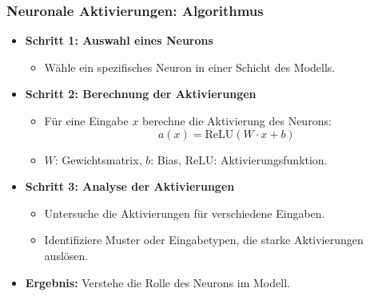 \documentclass[aspectratio=1610, xcolor=dvipsnames, 9pt]{beamer}
\begin{document}
\begin{frame}
  \frametitle{Neuronale Aktivierungen: Algorithmus}
  \begin{itemize}
    \item \textbf{Schritt 1: Auswahl eines Neurons}
    \begin{itemize}
      \item Wähle ein spezifisches Neuron in einer Schicht des Modells.
    \end{itemize}
    \item \textbf{Schritt 2: Berechnung der Aktivierungen}
    \begin{itemize}
      \item Für eine Eingabe $x$ berechne die Aktivierung des Neurons:
      \[
      a(x) = \text{ReLU}(W \cdot x + b)
      \]
      \item $W$: Gewichtsmatrix, $b$: Bias, $\text{ReLU}$: Aktivierungsfunktion.
    \end{itemize}
    \item \textbf{Schritt 3: Analyse der Aktivierungen}
    \begin{itemize}
      \item Untersuche die Aktivierungen für verschiedene Eingaben.
      \item Identifiziere Muster oder Eingabetypen, die starke Aktivierungen auslösen.
    \end{itemize}
    \item \textbf{Ergebnis:} Verstehe die Rolle des Neurons im Modell.
  \end{itemize}
\end{frame}
\end{document}
